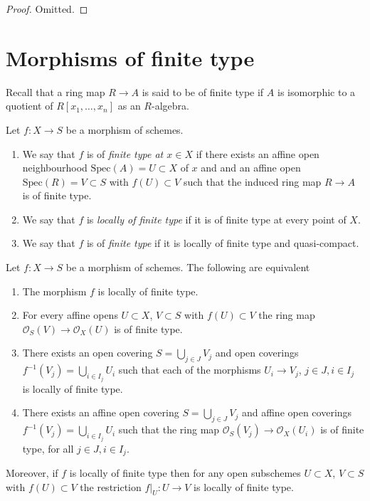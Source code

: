 \begin{proof}
Omitted.
\end{proof}








\section{Morphisms of finite type}
\label{section-finite-type}

\noindent
Recall that a ring map $R \to A$ is said to be of finite type
if $A$ is isomorphic to a quotient of $R[x_1, \ldots, x_n]$ as an $R$-algebra.

\begin{definition}
\label{definition-finite-type}
Let $f : X \to S$ be a morphism of schemes.
\begin{enumerate}
\item We say that $f$ is of {\it finite type at $x \in X$} if
there exists an affine open neighbourhood $\text{Spec}(A) = U \subset X$
of $x$ and and an affine open $\text{Spec}(R) = V \subset S$
with $f(U) \subset V$ such that the induced ring map
$R \to A$ is of finite type.
\item We say that $f$ is {\it locally of finite type} if it is
of finite type at every point of $X$.
\item We say that $f$ is of {\it finite type} if it is locally of
finite type and quasi-compact.
\end{enumerate}
\end{definition}

\begin{lemma}
\label{lemma-locally-finite-type-characterize}
Let $f : X \to S$ be a morphism of schemes.
The following are equivalent
\begin{enumerate}
\item The morphism $f$ is locally of finite type.
\item For every affine opens $U \subset X$, $V \subset S$
with $f(U) \subset V$ the ring map
$\mathcal{O}_S(V) \to \mathcal{O}_X(U)$ is of finite type.
\item There exists an open covering $S = \bigcup_{j \in J} V_j$
and open coverings $f^{-1}(V_j) = \bigcup_{i \in I_j} U_i$ such
that each of the morphisms $U_i \to V_j$, $j\in J, i\in I_j$
is locally of finite type.
\item There exists an affine open covering $S = \bigcup_{j \in J} V_j$
and affine open coverings $f^{-1}(V_j) = \bigcup_{i \in I_j} U_i$ such
that the ring map $\mathcal{O}_S(V_j) \to \mathcal{O}_X(U_i)$ is
of finite type, for all $j\in J, i\in I_j$.
\end{enumerate}
Moreover, if $f$ is locally of finite type then for
any open subschemes $U \subset X$, $V \subset S$ with $f(U) \subset V$
the restriction $f|_U : U \to V$ is locally of finite type.
\end{lemma}

